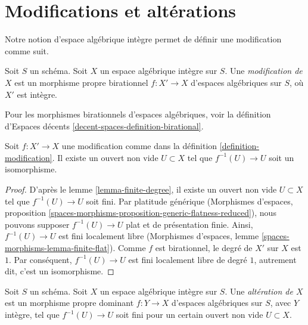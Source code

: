 
















\section{Modifications et altérations}
\label{section-modifications-alterations}

\noindent
Notre notion d'espace algébrique intègre permet de définir une modification
comme suit.

\begin{definition}
\label{definition-modification}
Soit $S$ un schéma. Soit $X$ un espace algébrique intègre sur $S$. Une
{\it modification de $X$} est un morphisme propre birationnel
$f : X' \to X$ d'espaces algébriques sur $S$, où $X'$ est intègre.
\end{definition}

\noindent
Pour les morphismes birationnels d'espaces algébriques, voir la
définition d'Espaces décents \ref{decent-spaces-definition-birational}.

\begin{lemma}
\label{lemma-modification-iso-over-open}
Soit $f : X' \to X$ une modification comme dans la
définition \ref{definition-modification}.
Il existe un ouvert non vide $U \subset X$ tel que $f^{-1}(U) \to U$
soit un isomorphisme.
\end{lemma}

\begin{proof}
D'après le
lemme \ref{lemma-finite-degree}, il existe un ouvert non vide $U \subset X$ tel
que $f^{-1}(U) \to U$ soit fini. Par platitude générique
(Morphismes d'espaces, proposition
\ref{spaces-morphisms-proposition-generic-flatness-reduced}),
nous pouvons supposer $f^{-1}(U) \to U$ plat et de présentation finie.
Ainsi, $f^{-1}(U) \to U$ est fini localement libre
(Morphismes d'espaces, lemme \ref{spaces-morphisms-lemma-finite-flat}).
Comme $f$ est birationnel, le degré de $X'$ sur $X$ est $1$.
Par conséquent, $f^{-1}(U) \to U$ est fini localement libre de degré $1$,
autrement dit, c'est un isomorphisme.
\end{proof}

\begin{definition}
\label{definition-alteration}
Soit $S$ un schéma. Soit $X$ un espace algébrique intègre sur $S$.
Une {\it altération de $X$} est un morphisme propre dominant $f : Y \to X$
d'espaces algébriques sur $S$, avec $Y$ intègre, tel que $f^{-1}(U) \to U$
soit fini pour un certain ouvert non vide $U \subset X$.
\end{definition}

